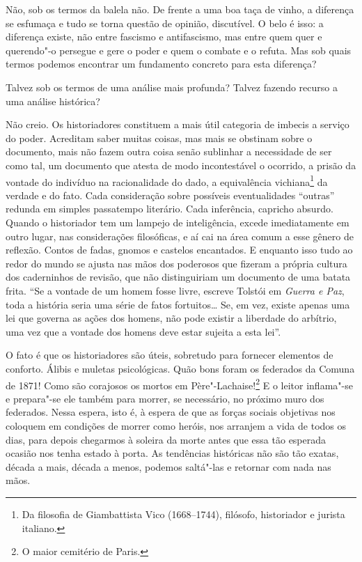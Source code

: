 Não, sob os termos da balela não. De frente a uma boa taça de vinho, a
diferença se esfumaça e tudo se torna questão de opinião, discutível. O
belo é isso: a diferença existe, não entre fascismo e antifascismo, mas
entre quem quer e querendo"-o persegue e gere o poder e quem o combate e
o refuta. Mas sob quais termos podemos encontrar um fundamento concreto
para esta diferença?

Talvez sob os termos de uma análise mais profunda? Talvez fazendo
recurso a uma análise histórica?

Não creio. Os historiadores constituem a mais útil categoria de imbecis
a serviço do poder. Acreditam saber muitas coisas, mas mais se obstinam
sobre o documento, mais não fazem outra coisa senão sublinhar a
necessidade de ser como tal, um documento que atesta de modo
incontestável o ocorrido, a prisão da vontade do indivíduo na
racionalidade do dado, a equivalência vichiana\footnote{Da filosofia de Giambattista Vico (1668--1744), filósofo,
  historiador e jurista italiano.} da verdade e do fato. Cada consideração sobre possíveis
eventualidades ``outras'' redunda em simples passatempo literário. Cada
inferência, capricho absurdo. Quando o historiador tem um lampejo de
inteligência, excede imediatamente em outro lugar, nas considerações
filosóficas, e aí cai na área comum a esse gênero de reflexão. Contos de
fadas, gnomos e castelos encantados. E enquanto isso tudo ao redor do
mundo se ajusta nas mãos dos poderosos que fizeram a própria cultura dos
caderninhos de revisão, que não distinguiriam um documento de uma batata
frita. ``Se a vontade de um homem fosse livre, escreve Tolstói em
\emph{Guerra e Paz}, toda a história seria uma série de fatos
fortuitos\ldots{} Se, em vez, existe apenas uma lei que governa as ações
dos homens, não pode existir a liberdade do arbítrio, uma vez que a
vontade dos homens deve estar sujeita a esta lei''.

O fato é que os historiadores são úteis, sobretudo para fornecer
elementos de conforto. Álibis e muletas psicológicas. Quão bons foram os
federados da Comuna de 1871! Como são corajosos os mortos em Père"-Lachaise!\footnote{O maior cemitério de Paris.} E o leitor inflama"-se e prepara"-se ele também para
morrer, se necessário, no próximo muro dos federados. Nessa espera, isto
é, à espera de que as forças sociais objetivas nos coloquem em condições
de morrer como heróis, nos arranjem a vida de todos os dias, para depois
chegarmos à soleira da morte antes que essa tão esperada ocasião nos
tenha estado à porta. As tendências históricas não são tão exatas,
década a mais, década a menos, podemos saltá"-las e retornar com nada nas
mãos.

